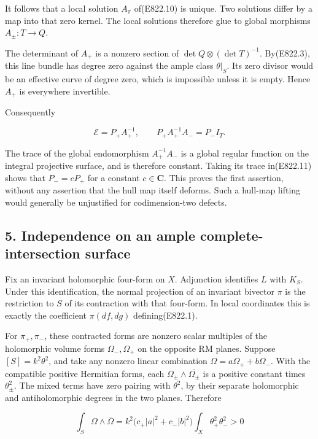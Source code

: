 It follows that a local solution \(A_\pi\) of(E822.10) is unique. Two
solutions differ by a map into that zero kernel. The local solutions
therefore glue to global morphisms \(A_\pm:T\to Q\).

The determinant of \(A_+\) is a nonzero section of
\(\det Q\otimes(\det T)^{-1}\). By(E822.3), this line bundle has degree
zero against the ample class \(\theta|_S\). Its zero divisor would be an
effective curve of degree zero, which is impossible unless it is empty.
Hence \(A_+\) is everywhere invertible.

Consequently

\[
 \mathcal E=P_+A_+^{-1},
 \qquad
 P_+ A_+^{-1}A_-=P_-I_T.
 \tag{E822.11}
\]

The trace of the global endomorphism \(A_+^{-1}A_-\) is a global regular
function on the integral projective surface, and is therefore constant.
Taking its trace in(E822.11) shows that \(P_-=cP_+\) for a constant
\(c\in\mathbf C\). This proves the first assertion, without any
assertion that the hull map itself deforms. Such a hull-map lifting
would generally be unjustified for codimension-two defects.

\subsection{5. Independence on an ample complete-intersection
surface}\label{SF-E822-independence-on-an-ample-complete-intersection-surface}

Fix an invariant holomorphic four-form on \(X\). Adjunction identifies
\(L\) with \(K_S\). Under this identification, the normal projection of
an invariant bivector \(\pi\) is the restriction to \(S\) of its
contraction with that four-form. In local coordinates this is exactly
the coefficient \(\pi(df,dg)\) defining(E822.1).

For \(\pi_+,\pi_-\), these contracted forms are nonzero scalar multiples
of the holomorphic volume forms \(\Omega_-,\Omega_+\) on the opposite RM
planes. Suppose \([S]=k^2\theta^2\), and take any nonzero linear
combination \(\Omega=a\Omega_++b\Omega_-\). With the compatible positive
Hermitian forms, each \(\Omega_\pm\wedge\overline{\Omega_\pm}\) is a
positive constant times \(\theta_\pm^2\). The mixed terms have zero
pairing with \(\theta^2\), by their separate holomorphic and
antiholomorphic degrees in the two planes. Therefore

\[
 \int_S\Omega\wedge\overline\Omega
  =k^2\bigl(c_+|a|^2+c_-|b|^2\bigr)
       \int_X\theta_+^2\theta_-^2>0
 \tag{E822.12}
\]

